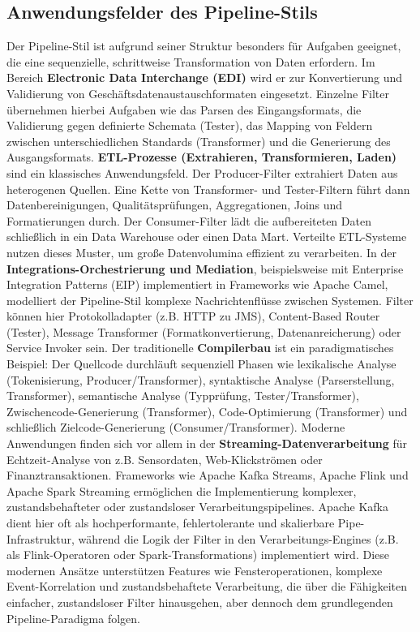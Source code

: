 \documentclass[10pt]{article}
\begin{document}
\begin{multicols}{2}
\section{Anwendungsfelder des Pipeline-Stils}
Der Pipeline-Stil ist aufgrund seiner Struktur besonders für Aufgaben geeignet, die eine sequenzielle, schrittweise Transformation von Daten erfordern.\cite{richards2020}
Im Bereich \textbf{Electronic Data Interchange (EDI)} wird er zur Konvertierung und Validierung von Geschäftsdatenaustauschformaten eingesetzt. Einzelne Filter übernehmen hierbei Aufgaben wie das Parsen des Eingangsformats, die Validierung gegen definierte Schemata (Tester), das Mapping von Feldern zwischen unterschiedlichen Standards (Transformer) und die Generierung des Ausgangsformats.\cite{richards2020}
\textbf{ETL-Prozesse (Extrahieren, Transformieren, Laden)} sind ein klassisches Anwendungsfeld. Der Producer-Filter extrahiert Daten aus heterogenen Quellen. Eine Kette von Transformer- und Tester-Filtern führt dann Datenbereinigungen, Qualitätsprüfungen, Aggregationen, Joins und Formatierungen durch. Der Consumer-Filter lädt die aufbereiteten Daten schließlich in ein Data Warehouse oder einen Data Mart.\cite{projectpro_etl_usecases} Verteilte ETL-Systeme nutzen dieses Muster, um große Datenvolumina effizient zu verarbeiten.\cite{researchgate_etl_dist}
In der \textbf{Integrations-Orchestrierung und Mediation}, beispielsweise mit Enterprise Integration Patterns (EIP) implementiert in Frameworks wie Apache Camel, modelliert der Pipeline-Stil komplexe Nachrichtenflüsse zwischen Systemen. Filter können hier Protokolladapter (z.B. HTTP zu JMS), Content-Based Router (Tester), Message Transformer (Formatkonvertierung, Datenanreicherung) oder Service Invoker sein.\cite{wso2_eip, richards2020}
Der traditionelle \textbf{Compilerbau} ist ein paradigmatisches Beispiel: Der Quellcode durchläuft sequenziell Phasen wie lexikalische Analyse (Tokenisierung, Producer/Transformer), syntaktische Analyse (Parserstellung, Transformer), semantische Analyse (Typprüfung, Tester/Transformer), Zwischencode-Generierung (Transformer), Code-Optimierung (Transformer) und schließlich Zielcode-Generierung (Consumer/Transformer).\cite{richards2020}
Moderne Anwendungen finden sich vor allem in der \textbf{Streaming-Datenverarbeitung} für Echtzeit-Analyse von z.B. Sensordaten, Web-Klickströmen oder Finanztransaktionen.\cite{acceldata_streaming} Frameworks wie Apache Kafka Streams, Apache Flink und Apache Spark Streaming ermöglichen die Implementierung komplexer, zustandsbehafteter oder zustandsloser Verarbeitungspipelines. Apache Kafka dient hier oft als hochperformante, fehlertolerante und skalierbare Pipe-Infrastruktur, während die Logik der Filter in den Verarbeitungs-Engines (z.B. als Flink-Operatoren oder Spark-Transformations) implementiert wird. Diese modernen Ansätze unterstützen Features wie Fensteroperationen, komplexe Event-Korrelation und zustandsbehaftete Verarbeitung, die über die Fähigkeiten einfacher, zustandsloser Filter hinausgehen, aber dennoch dem grundlegenden Pipeline-Paradigma folgen.\cite{dagster_frameworks}


\end{multicols}
\end{document}
